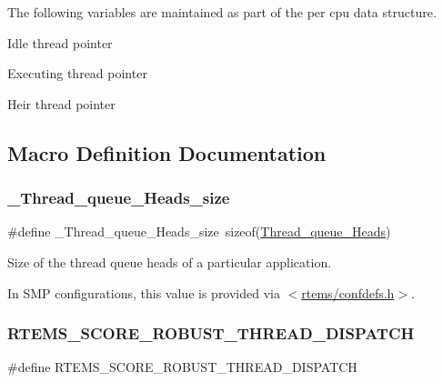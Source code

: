 The following variables are maintained as part of the per cpu data structure.


\begin{DoxyItemize}
\item Idle thread pointer
\item Executing thread pointer
\item Heir thread pointer 
\end{DoxyItemize}

\subsection{Macro Definition Documentation}
\mbox{\label{group__RTEMSScoreThread_ga51a02e6653cabfda359b41cc391a7ae4}} 
\subsubsection{\texorpdfstring{\_Thread\_queue\_Heads\_size}{\_Thread\_queue\_Heads\_size}}
{\footnotesize\ttfamily \#define \+\_\+\+Thread\+\_\+queue\+\_\+\+Heads\+\_\+size~sizeof(\mbox{\hyperlink{group__RTEMSScoreThreadQueue_gaebac32033b009cc8f606a90bd389f8e9}{Thread\+\_\+queue\+\_\+\+Heads}})}



Size of the thread queue heads of a particular application. 

In S\+MP configurations, this value is provided via $<$\mbox{\hyperlink{confdefs_8h}{rtems/confdefs.\+h}}$>$. \mbox{\label{group__RTEMSScoreThread_gaf826e03e6ef568e8773a98274b64e069}} 
\subsubsection{\texorpdfstring{RTEMS\_SCORE\_ROBUST\_THREAD\_DISPATCH}{RTEMS\_SCORE\_ROBUST\_THREAD\_DISPATCH}}
{\footnotesize\ttfamily \#define R\+T\+E\+M\+S\+\_\+\+S\+C\+O\+R\+E\+\_\+\+R\+O\+B\+U\+S\+T\+\_\+\+T\+H\+R\+E\+A\+D\+\_\+\+D\+I\+S\+P\+A\+T\+CH}



